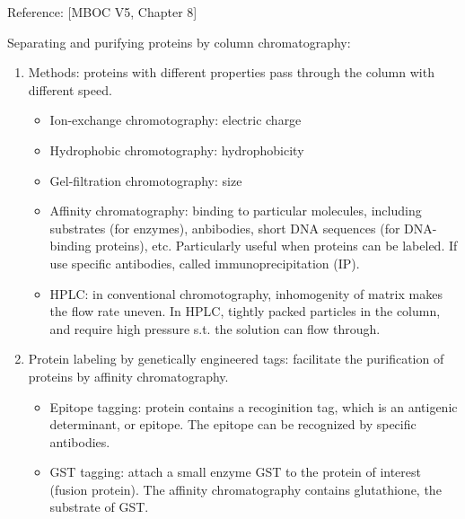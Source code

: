 \documentclass{report}
\begin{document}
Reference: [MBOC V5, Chapter 8]

Separating and purifying proteins by column chromatography: 
\begin{enumerate}
	\item Methods: proteins with different properties pass through the column with different speed. 
	\begin{itemize}
		\item Ion-exchange chromotography: electric charge
		\item Hydrophobic chromotography: hydrophobicity
		\item Gel-filtration chromotography: size
		\item Affinity chromatography: binding to particular molecules, including substrates (for enzymes), anbibodies, short DNA sequences (for DNA-binding proteins), etc. Particularly useful when proteins can be labeled. If use specific antibodies, called immunoprecipitation (IP). 
		\item HPLC: in conventional chromotography, inhomogenity of matrix makes the flow rate uneven. In HPLC, tightly packed particles in the column, and require high pressure s.t. the solution can flow through.  
	\end{itemize}
	
	\item Protein labeling by genetically engineered tags: facilitate the purification of proteins by affinity chromatography. 
	\begin{itemize}
		\item Epitope tagging: protein contains a recoginition tag, which is an antigenic determinant, or epitope. The epitope can be recognized by specific antibodies. 
		\item GST tagging: attach a small enzyme GST to the protein of interest (fusion protein). The affinity chromatography contains glutathione, the substrate of GST. 
	\end{itemize}
\end{enumerate}
	
\end{document}
